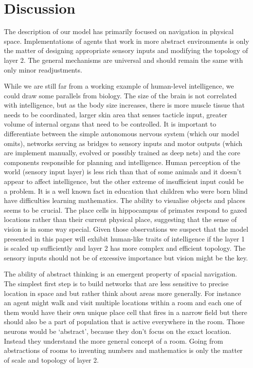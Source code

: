 \documentclass[12pt]{article}
\begin{document}
\section{Discussion}

The description of our model has primarily focused on navigation in physical space.
Implementations of agents that work in more abstract environments is only the matter of 
designing appropriate sensory inputs and modifying the topology of layer 2. The general mechanisms are universal and should remain the same with only minor readjustments.

While we are still far from a working example of human-level intelligence, we could draw some parallels from biology. The size of the brain is not correlated with intelligence, but as the body size increases, there is more muscle tissue that needs to be coordinated, larger skin area that senses tacticle input, greater volume of internal organs that need to be controlled. It is important to differentiate between the simple autonomous nervous system (which our model omits), networks serving as bridges to sensory inputs and motor  outputs (which are implement manually, evolved or possibly trained as deep nets) and the core components responsible for planning and intelligence. 
Human perception of the world (sensory input layer) is less rich than that of some animals and it doesn't appear to affect intelligence, but the other extreme of insufficient input could be a problem. It is a well known fact in education that children who were born blind have difficulties learning mathematics. The ability to visualise objects and places seems to be crucial. The place cells in hippocampus of primates respond to gazed locations rather than 
their current physical place, suggesting that the sense of vision is in some way special.
Given those observations we suspect that the model presented in this paper will exhibit human-like traits of intelligence if  the layer 1 is scaled up sufficiently and layer 2 has more complex and efficient topology. The sensory inputs should not be of excessive importance but vision might be the key. 

The ability of abstract thinking is an emergent property of spacial navigation. The simplest first step is to build networks that are less sensitive to precise location in space and but rather think about areas more generally. For instance an agent might walk and visit multiple locations within a room and each one of them would have their own unique place cell that fires in a narrow field but there should also be a part of population that is active everywhere in the room. Those neurons would be `abstract', because they don't focus on the exact location. Instead they understand the more general concept of a room. Going from abstractions of rooms to inventing numbers and mathematics is only the matter of scale and topology of layer 2. 
\end{document}
